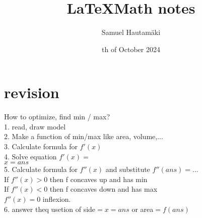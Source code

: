 \documentclass{article}
\title{\LaTeX Math notes}
\author{Samuel Hautamäki}
\date{th of October 2024}
\begin{document}
  \maketitle
   
  \section{revision}
  
  How to optimize, find min / max?\\
  1. read, draw model\\
  2. Make a function of min/max like area, volume,...\\
  3. Calculate formula for $f'(x)$\\
  4. Solve equation $f'(x)=$\\
  $x=ans$\\
  5. Calculate formula for $f''(x)$ and substitute $f''(ans)=...$\\
  If $f''(x)>0$ then f concaves up and has min\\
  If $f''(x)<0$ then f concaves down and has max\\
  $f''(x)=0$ inflexion.\\
  6. answer theq usetion of side$=x=ans$ or area$=f(ans)$\\
\end{document}
